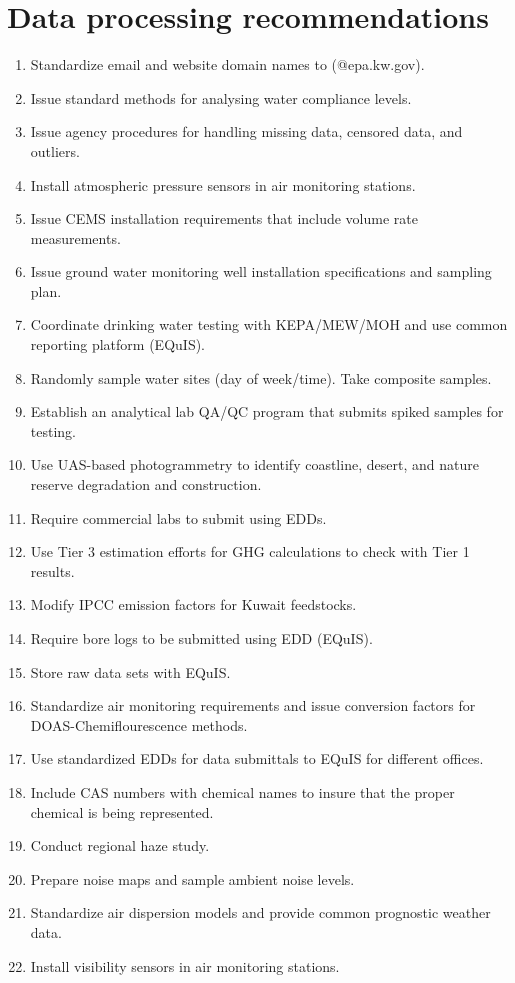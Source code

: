\section{Data processing recommendations}
\begin{enumerate}
\item Standardize email and website domain names to (@epa.kw.gov). 
\item Issue standard methods for analysing water compliance levels.
\item Issue agency procedures for handling missing data, censored data, and outliers.
\item Install atmospheric pressure sensors in air monitoring stations.
\item Issue CEMS installation requirements that include volume rate measurements.
\item Issue ground water monitoring well installation specifications and sampling plan.
\item Coordinate drinking water testing with KEPA/MEW/MOH and use common reporting platform (EQuIS).
\item Randomly sample water sites (day of week/time). Take composite samples.
\item Establish an analytical lab QA/QC program that submits spiked samples for testing.
\item Use UAS-based photogrammetry to identify coastline, desert, and nature reserve degradation and construction.
\item Require commercial labs to submit using EDDs.
\item Use Tier 3 estimation efforts for GHG calculations to check with Tier 1 results.
\item Modify IPCC emission factors for Kuwait feedstocks.
\item Require bore logs to be submitted using EDD (EQuIS).
\item Store raw data sets with EQuIS.
\item Standardize air monitoring requirements and issue conversion factors for DOAS-Chemiflourescence methods.
\item Use standardized EDDs for data submittals to EQuIS for different offices.
\item Include CAS numbers with chemical names to insure that the proper chemical is being represented.
\item Conduct regional haze study.
\item Prepare noise maps and sample ambient noise levels.
\item Standardize air dispersion models and provide common prognostic weather data.
\item Install visibility sensors in air monitoring stations.
\end{enumerate}

